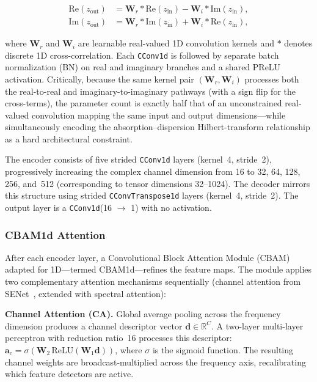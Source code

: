 \documentclass{article}
\begin{document}
\begin{align}
    \mathrm{Re}(z_{\text{out}}) &= \mathbf{W}_r \ast \mathrm{Re}(z_{\text{in}}) - \mathbf{W}_i \ast \mathrm{Im}(z_{\text{in}}), \\
    \mathrm{Im}(z_{\text{out}}) &= \mathbf{W}_r \ast \mathrm{Im}(z_{\text{in}}) + \mathbf{W}_i \ast \mathrm{Re}(z_{\text{in}}),
\end{align}

where $\mathbf{W}_r$ and $\mathbf{W}_i$ are learnable real-valued 1D convolution kernels and $\ast$ denotes discrete 1D cross-correlation. Each \texttt{CConv1d} is followed by separate batch normalization (BN) on real and imaginary branches and a shared PReLU activation. Critically, because the same kernel pair $(\mathbf{W}_r, \mathbf{W}_i)$ processes both the real-to-real and imaginary-to-imaginary pathways (with a sign flip for the cross-terms), the parameter count is exactly half that of an unconstrained real-valued convolution mapping the same input and output dimensions---while simultaneously encoding the absorption--dispersion Hilbert-transform relationship as a hard architectural constraint.

The encoder consists of five strided \texttt{CConv1d} layers (kernel~4, stride~2), progressively increasing the complex channel dimension from 16 to 32, 64, 128, 256, and~512 (corresponding to tensor dimensions 32--1024). The decoder mirrors this structure using strided \texttt{CConvTranspose1d} layers (kernel~4, stride~2). The output layer is a \texttt{CConv1d}(16 $\to$ 1) with no activation.

\subsubsection{CBAM1d Attention}

After each encoder layer, a Convolutional Block Attention Module (CBAM)~\cite{Woo2018} adapted for 1D---termed CBAM1d---refines the feature maps. The module applies two complementary attention mechanisms sequentially (channel attention from SENet~\cite{Hu2018}, extended with spectral attention):

\textbf{Channel Attention (CA).} Global average pooling across the frequency dimension produces a channel descriptor vector $\mathbf{d} \in \mathbb{R}^C$. A two-layer multi-layer perceptron with reduction ratio~16 processes this descriptor: $\mathbf{a}_c = \sigma(\mathbf{W}_2\,\mathrm{ReLU}(\mathbf{W}_1\mathbf{d}))$, where $\sigma$ is the sigmoid function. The resulting channel weights are broadcast-multiplied across the frequency axis, recalibrating which feature detectors are active.
\end{document}
